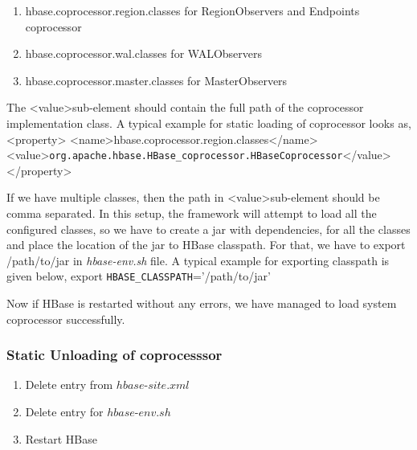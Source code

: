 \documentclass[11pt,a4paper,bibtotoc,idxtotoc,headsepline,footsepline,footexclude,BCOR12mm,DIV13]{scrbook}
\begin{document}
\begin{enumerate}
	
    \item hbase.coprocessor.region.classes for RegionObservers and Endpoints coprocessor
    \item hbase.coprocessor.wal.classes for WALObservers
    \item hbase.coprocessor.master.classes for MasterObservers
    
\end{enumerate}


The \textless value\textgreater \space sub-element should contain the full path of the coprocessor implementation class. A typical example for static loading of coprocessor looks as,\newline \newline 
\textless property\textgreater \newline
\textless name\textgreater hbase.coprocessor.region.classes\textless /name\textgreater \newline
\textless value\textgreater \texttt{org.apache.hbase.HBase\_coprocessor.HBaseCoprocessor}\textless /value\textgreater \newline
\textless /property\textgreater \newline

 If we have multiple classes, then the path in \textless value\textgreater \space sub-element should be comma separated. In this setup, the framework will attempt to load all the configured classes, so we have to create a jar with dependencies, for all the classes and place the location of the jar to HBase classpath. For that, we have to export /path/to/jar in \emph{hbase-env.sh} file. A typical example for exporting classpath is given below, \newline \newline
 export \texttt{HBASE\_CLASSPATH}='/path/to/jar' \newline
 
Now if HBase is restarted without any errors, we have managed to load system coprocessor successfully. 

\subsubsection{Static Unloading of coprocesssor}
\begin{enumerate}
    \item Delete entry from $hbase$-$site.xml$
    \item Delete entry for $hbase$-$env.sh$
    \item Restart HBase
\end{enumerate}
\end{document}
